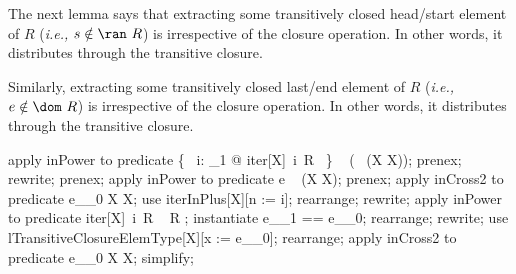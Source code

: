 
The next lemma says that extracting some transitively closed head/start element of
$R$ (\textit{i.e.,} $s \notin \ran~ R$) is irrespective of the closure operation.
In other words, it distributes through the transitive closure.
%

Similarly, extracting some transitively closed last/end element of
$R$ (\textit{i.e.,} $e \notin \dom~ R$) is irrespective of the closure
operation. In other words, it distributes through the transitive closure.
%


\begin{LPScript}\begin{forget}[lIteratedTransitiveClosureType]
apply inPower to predicate \{~  i: \nat _1{} @ iter[X]~i~R ~\} \in  \power~  (\power~  (X \cross  X));
prenex;
rewrite;
prenex;
apply inPower to predicate e \in  \power~  (X \cross  X);
prenex;
apply inCross2 to predicate e\_\_0 \in  X \cross  X;
use iterInPlus[X][n := i];
rearrange;
rewrite;
apply inPower to predicate iter[X]~i~R \in  \power~  R \plus [X];
instantiate e\_\_1 == e\_\_0;
rearrange;
rewrite;
use lTransitiveClosureElemType[X][x := e\_\_0];
rearrange;
apply inCross2 to predicate e\_\_0 \in  X \cross  X;
simplify;
\end{forget}\end{LPScript}

